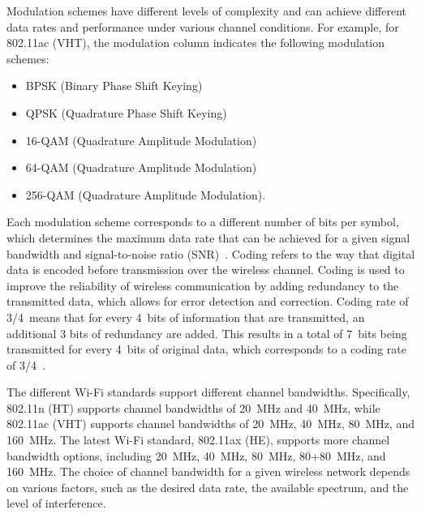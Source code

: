 Modulation schemes have different levels of complexity and can achieve different data rates and performance under various channel conditions.
For example, for 802.11ac (VHT), the modulation column indicates the following modulation schemes: 
\begin{itemize}
    \item BPSK (Binary Phase Shift Keying)
    \item QPSK (Quadrature Phase Shift Keying)
    \item 16-QAM (Quadrature Amplitude Modulation)
    \item 64-QAM (Quadrature Amplitude Modulation)
    \item 256-QAM (Quadrature Amplitude Modulation). 
\end{itemize}    
Each modulation scheme corresponds to a different number of bits per symbol, which determines the maximum data rate that can be achieved for a given signal bandwidth and signal-to-noise ratio (SNR)~\cite{proakis2008digital}.
Coding refers to the way that digital data is encoded before transmission over the wireless channel. 
Coding is used to improve the reliability of wireless communication by adding redundancy to the transmitted data, which allows for error detection and correction. Coding rate of 3/4~means that for every 4~bits of information that are transmitted, an additional 3 bits of redundancy are added. This results in a total of 7~bits being transmitted for every 4~bits of original data, which corresponds to a coding rate of 3/4~\cite{rappaport-2002}.

The different Wi-Fi standards support different channel bandwidths. Specifically, 802.11n (HT) supports channel bandwidths of 20~MHz and 40~MHz, while 802.11ac (VHT) supports channel bandwidths of 20~MHz, 40~MHz, 80~MHz, and 160~MHz. The latest Wi-Fi standard, 802.11ax (HE), supports more channel bandwidth options, including 20~MHz, 40~MHz, 80~MHz, 80+80~MHz, and 160~MHz. The choice of channel bandwidth for a given wireless network depends on various factors, such as the desired data rate, the available spectrum, and the level of interference.

